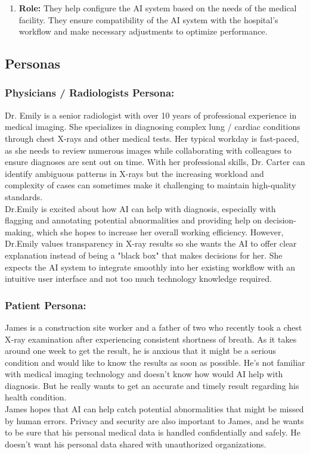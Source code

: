\documentclass[12pt]{article}
\begin{document}
\begin{enumerate}
\item \textbf{Role:} They help configure the AI system based on the needs of the medical facility. They ensure compatibility of the AI system with the hospital's workflow and make necessary adjustments to optimize performance.
\end{enumerate}
\subsection{Personas}
\subsubsection{Physicians / Radiologists Persona:}

Dr. Emily is a senior radiologist with over 10 years of professional experience in medical imaging. She specializes in diagnosing complex lung / cardiac conditions through chest X-rays and other medical tests. Her typical workday is fast-paced, as she needs to review numerous images while collaborating with colleagues to ensure diagnoses are sent out on time. With her professional skills, Dr. Carter can identify ambiguous patterns in X-rays but the increasing workload and complexity of cases can sometimes make it challenging to maintain high-quality standards.\\
\newline
Dr.Emily is excited about how AI can help with diagnosis, especially with flagging and annotating potential abnormalities and providing help on decision-making, which she hopes to increase her overall working efficiency. However, Dr.Emily values transparency in X-ray results so she wants the AI to offer clear explanation instead of being a "black box" that makes decisions for her. She expects the AI system to integrate smoothly into her existing workflow with an intuitive user interface and not too much technology knowledge required. 

\subsubsection{Patient Persona:}
James is a construction site worker and a father of two who recently took a chest X-ray examination after experiencing consistent shortness of breath. As it takes around one week to get the result, he is anxious that it might be a serious condition and would like to know the results as soon as possible. He's not familiar with medical imaging technology and doesn't know how would AI help with diagnosis. But he really wants to get an accurate and timely result regarding his health condition.\\
\newline
James hopes that AI can help catch potential abnormalities that might be missed by human errors. Privacy and security are also important to James, and he wants to be sure that his personal medical data is handled confidentially and safely. He doesn't want his personal data shared with unauthorized organizations. 
\end{document}
